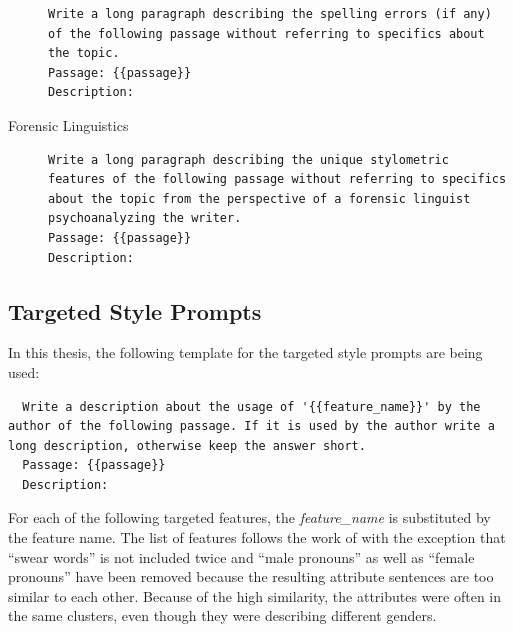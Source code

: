 \begin{description}
        \begin{minipage}{\linewidth}
          \begin{lstlisting}
Write a long paragraph describing the spelling errors (if any) of the following passage without referring to specifics about the topic.
Passage: {{passage}}
Description:
\end{lstlisting}
        \end{minipage}
  \item[Forensic Linguistics]\leavevmode \newline
        \begin{minipage}{\linewidth}
          \begin{lstlisting}
Write a long paragraph describing the unique stylometric features of the following passage without referring to specifics about the topic from the perspective of a forensic linguist psychoanalyzing the writer.
Passage: {{passage}}
Description:
\end{lstlisting}
        \end{minipage}
\end{description}

\subsection{Targeted Style Prompts}
\label{sec:appendix:targetPrompts}

In this thesis, the following template for the targeted style prompts are being used:
\begin{lstlisting}
  Write a description about the usage of '{{feature_name}}' by the author of the following passage. If it is used by the author write a long description, otherwise keep the answer short.
  Passage: {{passage}}
  Description:
\end{lstlisting}

For each of the following targeted features, the \textit{feature\_name} is substituted by the feature name. The list of features follows the work of \citet{patelLearningInterpretableStyle2023} with the exception that \enquote{swear words} is not included twice and \enquote{male pronouns} as well as \enquote{female pronouns} have been removed because the resulting attribute sentences are too similar to each other. Because of the high similarity, the attributes were often in the same clusters, even though they were describing different genders.

